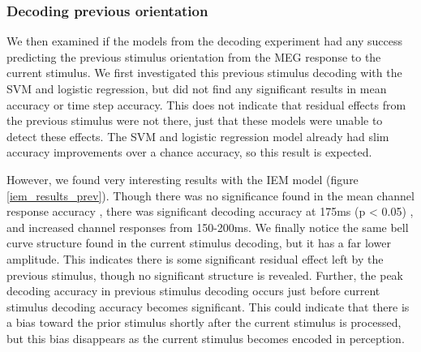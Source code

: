 \documentclass[../main.tex]{subfiles}
\begin{document}
\subsubsection{Decoding previous orientation}
We then examined if the models from the decoding experiment had any success predicting the previous stimulus orientation from the MEG response to the current stimulus. We first investigated this previous stimulus decoding with the SVM and logistic regression, but did not find any significant results in mean accuracy or time step accuracy. This does not indicate that residual effects from the previous stimulus were not there, just that these models were unable to detect these effects. The SVM and logistic regression model already had slim accuracy improvements over a chance accuracy, so this result is expected.

However, we found very interesting results with the IEM model (figure \ref{iem_results_prev}). Though there was no significance found in the mean channel response accuracy , there was significant decoding accuracy at 175ms (p < 0.05) , and increased channel responses from 150-200ms. We finally notice the same bell curve structure found in the current stimulus decoding, but it has a far lower amplitude. This indicates there is some significant residual effect left by the previous stimulus, though no significant structure is revealed. Further, the peak decoding accuracy in previous stimulus decoding occurs just before current stimulus decoding accuracy becomes significant. This could indicate that there is a bias toward the prior stimulus shortly after the current stimulus is processed, but this bias disappears as the current stimulus becomes encoded in perception.
\end{document}
